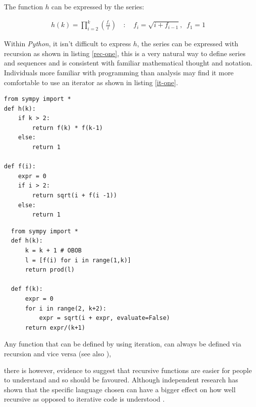 \documentclass[11pt]{article}
\begin{document}
The function \(h\) can be expressed by the series:

$$\begin{aligned}
h\left( k \right) = \prod^k_{i = 2} \left( \frac{f_i}{i}  \right)  \quad : \quad f_i = \sqrt{i +  f_{i - 1}}, \enspace f_{1} = 1
\end{aligned}$$

Within \emph{Python}, it isn't difficult to express \(h\), the series can be expressed
with recursion as shown in listing \ref{rec-one}, this is a very natural way to define
series and sequences and is consistent with familiar mathematical thought and
notation. Individuals more familiar with programming than analysis may find it
more comfortable to use an iterator as shown in listing \ref{it-one}.

\begin{lstlisting}
from sympy import *
def h(k):
    if k > 2:
        return f(k) * f(k-1)
    else:
        return 1

def f(i):
    expr = 0
    if i > 2:
        return sqrt(i + f(i -1))
    else:
        return 1
\end{lstlisting}


\begin{lstlisting}
  from sympy import *
  def h(k):
      k = k + 1 # OBOB
      l = [f(i) for i in range(1,k)]
      return prod(l)

  def f(k):
      expr = 0
      for i in range(2, k+2):
          expr = sqrt(i + expr, evaluate=False)
      return expr/(k+1)
\end{lstlisting}

Any function that can be defined by using iteration, can always be defined via
recursion and vice versa
\cite{bohmReducingRecursionIteration1988,bohmReducingRecursionIteration1986}
(see also
\cite{smolarskiMath60Notes2000,IterationVsRecursion2016} ),

there is however, evidence to suggest that recursive functions are easier for
people to understand \cite{benanderEmpiricalAnalysisDebugging2000} and so should
be favoured. Although independent research has shown that the specific language
chosen can have a bigger effect on how well recursive as opposed to iterative
code is understood \cite{sinhaCognitiveFitEmpirical1992}.
\end{document}
